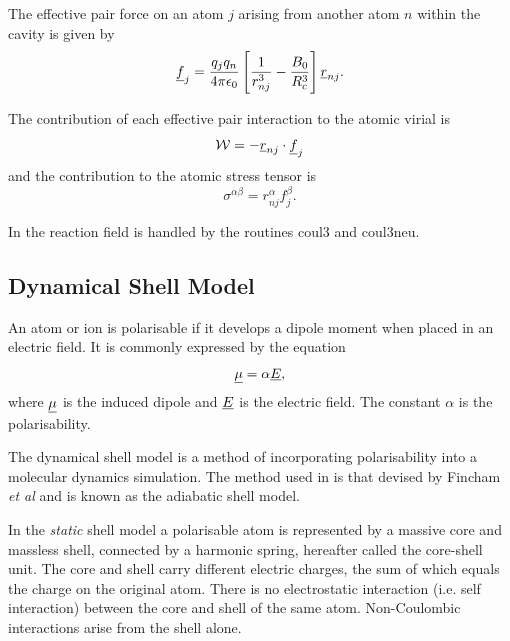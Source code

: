 The effective pair force on an atom $j$ arising from another atom $n$
within the cavity is given by
\begin{equation}
\mbox{$\underline{f}$}_{j}=\frac{q_{j}q_{n}}{4\pi\epsilon_{0}}\left [
\frac{1}{r_{nj}^{3}}-\frac{B_{0}}{R_{c}^{3}}\right ]\mbox{$\underline{r}$}_{nj}.
\end{equation}

The contribution of each effective pair interaction to the atomic
virial is
\begin{equation}
{\cal W}=-\mbox{$\underline{r}$}_{nj}\cdot \mbox{$\underline{f}$}_{j}
\end{equation}
and the contribution to the atomic stress tensor is
\begin{equation}
\sigma^{\alpha \beta}=r_{nj}^{\alpha}f_{j}^{\beta}.
\end{equation}

In \D{} the reaction field is handled by the routines {\sc
coul3} and {\sc coul3neu}.

\subsection{Dynamical Shell Model}

An atom or ion is polarisable if it develops a dipole moment when
placed in an electric field. It is commonly expressed by the equation
\begin{equation}
\mbox{$\underline{\mu}$}=\alpha \mbox{$\underline{E}$},
\end{equation}
where $\mbox{$\underline{\mu}$}$ is the induced dipole and $\mbox{$\underline{E}$}$ is the electric
field. The constant $\alpha$ is the polarisability. 

The dynamical shell model is a method of incorporating polarisability
into a molecular dynamics 
simulation. The method used in \D{}
is that devised by Fincham {\em et al} \cite{fincham-93a} and is known
as the adiabatic shell model. 

In the {\em static} shell model a
polarisable atom is represented by a
massive core and massless shell, connected by a harmonic spring,
hereafter called the core-shell unit. The core and shell carry
different electric charges, the sum of which equals the charge on the
original atom. There is no electrostatic interaction (i.e. self
interaction) between the core and shell of the same atom.
Non-Coulombic interactions arise from the shell alone.

